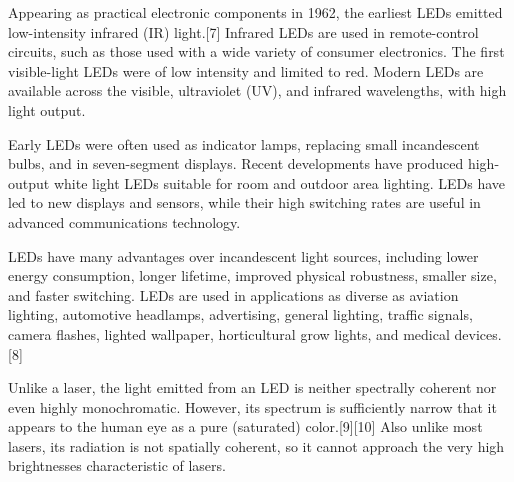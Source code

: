 \documentclass[\main/master.tex]{subfiles}
\begin{document}
Appearing as practical electronic components in 1962, the earliest LEDs emitted low-intensity infrared (IR) light.[7] Infrared LEDs are used in remote-control circuits, such as those used with a wide variety of consumer electronics. The first visible-light LEDs were of low intensity and limited to red. Modern LEDs are available across the visible, ultraviolet (UV), and infrared wavelengths, with high light output.

Early LEDs were often used as indicator lamps, replacing small incandescent bulbs, and in seven-segment displays. Recent developments have produced high-output white light LEDs suitable for room and outdoor area lighting. LEDs have led to new displays and sensors, while their high switching rates are useful in advanced communications technology.

LEDs have many advantages over incandescent light sources, including lower energy consumption, longer lifetime, improved physical robustness, smaller size, and faster switching. LEDs are used in applications as diverse as aviation lighting, automotive headlamps, advertising, general lighting, traffic signals, camera flashes, lighted wallpaper, horticultural grow lights, and medical devices.[8]

Unlike a laser, the light emitted from an LED is neither spectrally coherent nor even highly monochromatic. However, its spectrum is sufficiently narrow that it appears to the human eye as a pure (saturated) color.[9][10] Also unlike most lasers, its radiation is not spatially coherent, so it cannot approach the very high brightnesses characteristic of lasers.
\end{document}
